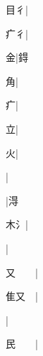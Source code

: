 \begin{multicols}{2}
{{\cjk{}{\cnsym{}　}目{彳}}|{}\par
{\cjk{}{\cnsym{}　}疒{彳}}|{}\par
{\cjk{}{\cnsym{}　}{\cnsym{}　}金}|{\cjk{}鍀}\par
{\cjk{}{\cnsym{}　}{\cnsym{}　}角}|{}\par
{\cjk{}{\cnsym{}　}{\cnsym{}　}疒}|{}\par
{立}|{}\par
{\cjk{}{\cnsym{}　}{\cnsym{}　}火}|{}\par
{}|{}\par
{}|{\cjk{}淂}\par
{\cjk{}{\cnsym{}　}木{\cnxHanaA{}氵}}|{}\par
{}|{}\par
{\cjk{}又{\cnsym{}　}{\cnsym{}　}}|{}\par
{\cjk{}隹又{\cnsym{}　}}|{}\par
{\cjk{}{\cnsym{}　}{\cnsym{}　}{\cnsym{}　}}|{}\par
{\cjk{}民{\cnsym{}　}{\cnsym{}　}}|{}\par
}
\end{multicols}
